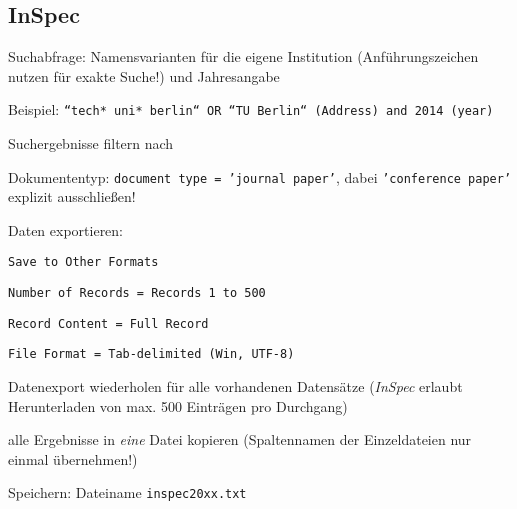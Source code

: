 \subsection*{InSpec}
\begin{compactitem}
\item Suchabfrage: Namensvarianten für die eigene Institution (Anführungszeichen nutzen für exakte Suche!)  und Jahresangabe
	\begin{compactitem}
    \item Beispiel: \texttt{``tech* uni* berlin``  OR ``TU Berlin`` (Address) and 2014 (year)}
    \end{compactitem}
\item Suchergebnisse filtern nach
	\begin{compactitem}
    \item Dokumententyp: \texttt{document type = 'journal paper'}, dabei \texttt{'conference paper'} explizit ausschließen!
    \end{compactitem}
\item Daten exportieren: 
	\begin{compactitem}
	\item \texttt{Save to Other Formats}
    \item \texttt{Number of Records = Records 1 to 500}
    \item \texttt{Record Content = Full Record}
    \item \texttt{File Format = Tab-delimited (Win, UTF-8)}
	\end{compactitem}
\item Datenexport wiederholen für alle vorhandenen Datensätze (\textit{InSpec} erlaubt Herunterladen von max. 500 Einträgen pro Durchgang)
\item alle Ergebnisse in \textit{eine} Datei kopieren (Spaltennamen der Einzeldateien nur einmal übernehmen!)
\item Speichern: Dateiname \texttt{inspec20xx.txt}
\end{compactitem}

